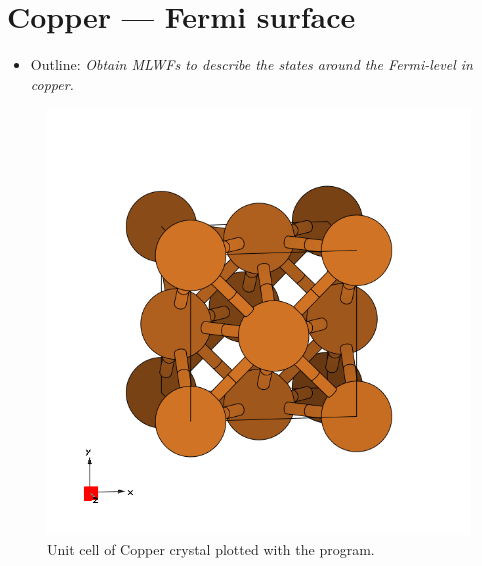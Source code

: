 \section{Copper --- Fermi surface}
\label{sec6:copper}

\begin{itemize}
\item Outline: {\it Obtain MLWFs to describe the states around the Fermi-level in copper.}
\end{itemize}

\begin{figure}[h!]
\centering
\includegraphics[width=0.25\columnwidth,trim={45pt 45pt 55pt 55pt},clip]{figure/example04/copper_crystal.png}
\caption{Unit cell of Copper crystal plotted with the \xcrysden{} program.}
\label{fig6.0}
\end{figure}


